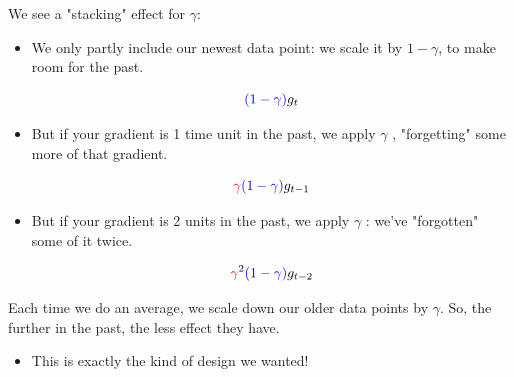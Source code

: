             \phantom{}

            We see a "stacking" effect for $\gamma$: 
            
            \begin{itemize}
                \item We only partly include our newest data point: we scale it by $1-\gamma$, to make room for the past.

                \begin{equation}
                    \textcolor{blue}{(1-\gamma)} g_{t}
                \end{equation}
                
                \item But if your gradient is 1 time unit in the past, we apply $\gamma$ , "forgetting" some more of that gradient.

                \begin{equation}
                    \textcolor{red}{\gamma}\textcolor{blue}{(1-\gamma)} g_{t-1}
                \end{equation}

                \item But if your gradient is 2 units in the past, we apply $\gamma$ : we've "forgotten" some of it twice.

                \begin{equation}
                    \textcolor{red}{\gamma}^2\textcolor{blue}{(1-\gamma)} g_{t-2}
                \end{equation}
            \end{itemize}

            Each time we do an average, we scale down our older data points by $\gamma$. So, the further in the past, the less effect they have.

            \begin{itemize}
                \item This is exactly the kind of design we wanted!\\
            \end{itemize}

